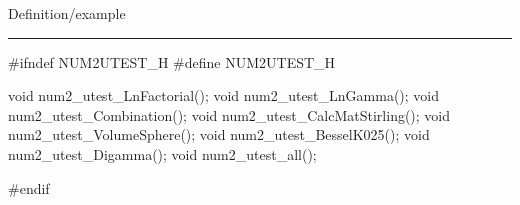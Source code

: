
Definition/example

\bigskip
\hrule
\code
#ifndef NUM2UTEST_H
#define NUM2UTEST_H
\endcode

\code

void num2_utest_LnFactorial();
void num2_utest_LnGamma();
void num2_utest_Combination();
void num2_utest_CalcMatStirling();
void num2_utest_VolumeSphere();
void num2_utest_BesselK025();
void num2_utest_Digamma();
void num2_utest_all();

#endif
\endcode
